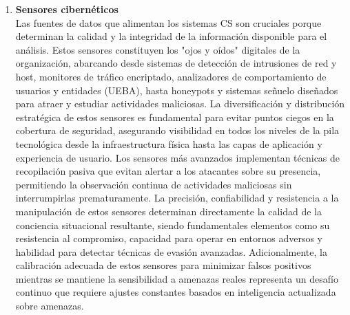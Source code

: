 \begin{enumerate}
\item \textbf{Sensores cibernéticos} \\
Las fuentes de datos que alimentan los sistemas CS son cruciales porque determinan la calidad y la integridad de la información disponible para el análisis. Estos sensores constituyen los "ojos y oídos" digitales de la organización, abarcando desde sistemas de detección de intrusiones de red y host, monitores de tráfico encriptado, analizadores de comportamiento de usuarios y entidades (UEBA), hasta honeypots y sistemas señuelo diseñados para atraer y estudiar actividades maliciosas. La diversificación y distribución estratégica de estos sensores es fundamental para evitar puntos ciegos en la cobertura de seguridad, asegurando visibilidad en todos los niveles de la pila tecnológica desde la infraestructura física hasta las capas de aplicación y experiencia de usuario. Los sensores más avanzados implementan técnicas de recopilación pasiva que evitan alertar a los atacantes sobre su presencia, permitiendo la observación continua de actividades maliciosas sin interrumpirlas prematuramente. La precisión, confiabilidad y resistencia a la manipulación de estos sensores determinan directamente la calidad de la conciencia situacional resultante, siendo fundamentales elementos como su resistencia al compromiso, capacidad para operar en entornos adversos y habilidad para detectar técnicas de evasión avanzadas. Adicionalmente, la calibración adecuada de estos sensores para minimizar falsos positivos mientras se mantiene la sensibilidad a amenazas reales representa un desafío continuo que requiere ajustes constantes basados en inteligencia actualizada sobre amenazas.


\end{enumerate}
